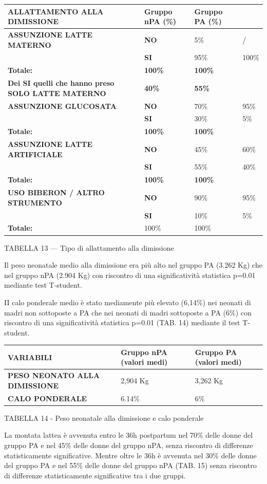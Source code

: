 \documentclass[]{article}
\begin{document}
\begin{longtable}[]{@{}llll@{}}
\toprule
\textbf{ALLATTAMENTO ALLA DIMISSIONE} & \textbf{Gruppo nPA (\%)} &
\textbf{Gruppo PA (\%)} &\tabularnewline
\midrule
\endhead
\textbf{ASSUNZIONE LATTE MATERNO} & \textbf{NO} & 5\% & /\tabularnewline
& \textbf{SI} & 95\% & 100\%\tabularnewline
\textbf{Totale:} & \textbf{100\%} & \textbf{100\%} &\tabularnewline
\textbf{Dei SI quelli che hanno preso SOLO LATTE MATERNO} &
\textbf{40\%} & \textbf{55\%} &\tabularnewline
\textbf{ASSUNZIONE GLUCOSATA} & \textbf{NO} & 70\% & 95\%\tabularnewline
& \textbf{SI} & 30\% & 5\%\tabularnewline
\textbf{Totale:} & \textbf{100\%} & \textbf{100\%} &\tabularnewline
\textbf{ASSUNZIONE LATTE ARTIFICIALE} & \textbf{NO} & 45\% &
60\%\tabularnewline
& \textbf{SI} & 55\% & 40\%\tabularnewline
\textbf{Totale:} & \textbf{100\%} & \textbf{100\%} &\tabularnewline
\textbf{USO BIBERON / ALTRO STRUMENTO} & \textbf{NO} & 90\% &
95\%\tabularnewline
& \textbf{SI} & 10\% & 5\%\tabularnewline
\textbf{Totale:} & 100\% & 100\% &\tabularnewline
\bottomrule
\end{longtable}

TABELLA 13 --- Tipo di allattamento alla dimissione

Il peso neonatale medio alla dimissione era più alto nel gruppo PA
(3.262 Kg) che nel gruppo nPA (2.904 Kg) con riscontro di una
significatività statistica p=0.01 mediante test T-student.

II calo ponderale medio è stato mediamente più elevato (6,14\%) nei
neonati di madri non sottoposte a PA che nei neonati di madri sottoposte
a PA (6\%) con riscontro di una significatività statistica p=0.01 (TAB.
14) mediante il test T-student.

\begin{longtable}[]{@{}lll@{}}
\toprule
VARIABILI & \textbf{Gruppo nPA (valori medi)} & \textbf{Gruppo PA
(valori medi)}\tabularnewline
\midrule
\endhead
\textbf{PESO NEONATO ALLA DIMISSIONE} & 2,904 Kg & 3,262
Kg\tabularnewline
\textbf{CALO PONDERALE} & 6.14\% & 6\%\tabularnewline
\bottomrule
\end{longtable}

TABELLA 14 - Peso neonatale alla dimissione e calo ponderale

La montata lattea è avvenuta entro le 36h postpartum nel 70\% delle
donne del gruppo PA e nel 45\% delle donne del gruppo nPA, senza
riscontro di differenze statisticamente significative. Mentre oltre le
36h è avvenuta nel 30\% delle donne del gruppo PA e nel 55\% delle donne
del gruppo nPA (TAB. 15) senza riscontro di differenze statisticamente
significative tra i due gruppi.
\end{document}
